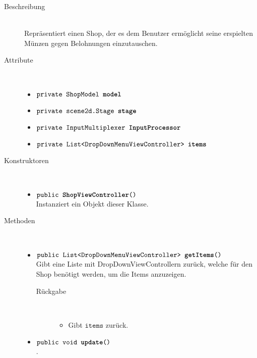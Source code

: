 \begin{description}
\item[Beschreibung] \hfill \\ Repräsentiert einen Shop, der es dem Benutzer ermöglicht seine erspielten Münzen gegen Belohnungen einzutauschen.

\item[Attribute] \hfill \\
	\vspace{-.8cm}
	\begin{itemize}	
		\item $\texttt{private ShopModel \textbf{model}}$ \\ 
		\item $\texttt{private scene2d.Stage \textbf{stage}}$ \\ 		
		\item $\texttt{private InputMultiplexer \textbf{InputProcessor}}$ \\ 
		\item $\texttt{private List<DropDownMenuViewController> \textbf{items}}$ \\ 
		\end{itemize}
	
\item[Konstruktoren] \hfill \\
	\vspace{-.8cm}
	\begin{itemize}
		\item $\texttt{public \textbf{ShopViewController}()}$ \\ Instanziert ein Objekt dieser Klasse.

	\end{itemize}
	
\item[Methoden] \hfill \\
	\vspace{-.8cm}
	\begin{itemize}
		\item $\texttt{public List<DropDownMenuViewController> \textbf{getItems}()}$ \\ Gibt eine Liste mit DropDownViewControllern zurück, welche für den Shop benötigt werden, um die Items anzuzeigen.
		\begin{description}
			\item[Rückgabe] \hfill \\
			\vspace{-.8cm}
			\begin{itemize}
				\item Gibt $\texttt{items}$ zurück.
			\end{itemize}
			\end{description}
		
		\item $\texttt{public void \textbf{update}()}$ \\.


		\end{itemize}
	\end{description}
	
